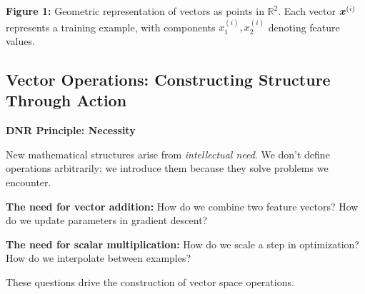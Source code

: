 \begin{center}

    \textbf{Figure 1:} Geometric representation of vectors as points in $\mathbb{R}^2$. Each vector $\bm{x}^{(i)}$ represents a training example, with components $x_1^{(i)}, x_2^{(i)}$ denoting feature values.
\end{center}

\subsection{Vector Operations: Constructing Structure Through Action}

\begin{necessitybox}
    \textbf{DNR Principle: Necessity}

    New mathematical structures arise from \textit{intellectual need}. We don't
    define operations arbitrarily; we introduce them because they solve problems we
    encounter.

    \textbf{The need for vector addition:} How do we combine two feature vectors? How do we update parameters in gradient descent?

    \textbf{The need for scalar multiplication:} How do we scale a step in optimization? How do we interpolate between examples?

    These questions drive the construction of vector space operations.
\end{necessitybox}

